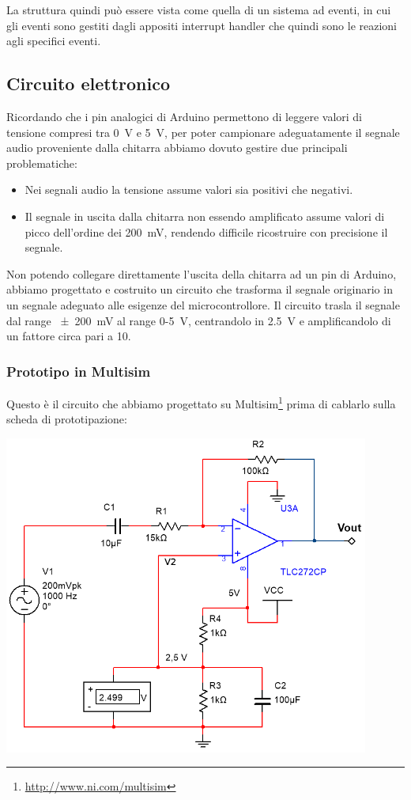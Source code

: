\documentclass[a4paper,11pt]{article}
\begin{document}
La struttura quindi può essere vista come quella di un sistema ad eventi, in cui gli eventi sono gestiti dagli appositi interrupt handler che quindi sono le reazioni agli specifici eventi.

\subsection{Circuito elettronico}
Ricordando che i pin analogici di Arduino permettono di leggere valori di tensione compresi tra \SI{0}{\volt} e \SI{5}{\volt}, per poter campionare adeguatamente il segnale audio proveniente dalla chitarra abbiamo dovuto gestire due principali problematiche:
\begin{itemize}
    \item Nei segnali audio la tensione assume valori sia positivi che negativi.
    \item Il segnale in uscita dalla chitarra non essendo amplificato assume valori di picco dell'ordine dei \SI{200}{\milli\volt}, rendendo difficile ricostruire con precisione il segnale.
\end{itemize}

Non potendo collegare direttamente l'uscita della chitarra ad un pin di Arduino, abbiamo progettato e costruito un circuito che trasforma il segnale originario in un segnale adeguato alle esigenze del microcontrollore. Il circuito trasla il segnale dal range \SI{+-200}{\milli\volt} al range \num{0}-\SI{5}{\volt}, centrandolo in \SI{2.5}{\volt} e amplificandolo di un fattore circa pari a \num{10}.

\newpage
\subsubsection{Prototipo in Multisim}
Questo è il circuito che abbiamo progettato su Multisim\footnote{\url{http://www.ni.com/multisim}} prima di cablarlo sulla scheda di prototipazione:

\begin{center}
\includegraphics[width=0.9\textwidth]{screen.png}
\end{center}
\end{document}
